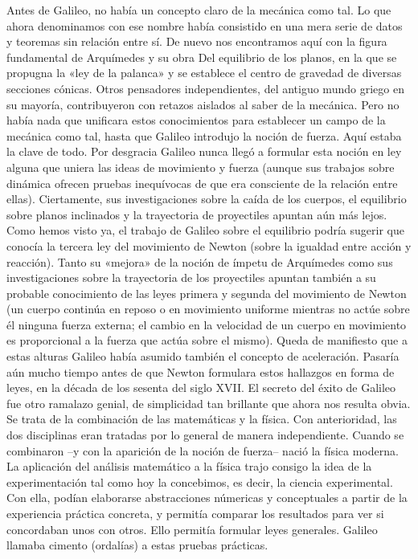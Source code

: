 \documentclass[letterpaper, 10pt, journal]{IEEEtran}
\begin{document}
Antes de Galileo, no había un concepto claro de la mecánica como tal. Lo que ahora denominamos con ese nombre había consistido en una mera serie de datos y teoremas sin relación entre sí. De nuevo nos encontramos aquí con la figura fundamental de Arquímedes y su obra Del equilibrio de los planos, en la que se propugna la «ley de la palanca» y se establece el centro de gravedad de diversas secciones cónicas. Otros pensadores independientes, del antiguo mundo griego en su mayoría, contribuyeron con retazos aislados al saber de la mecánica. Pero no había nada que unificara estos conocimientos para establecer un campo de la mecánica como tal, hasta que Galileo introdujo la noción de fuerza. Aquí estaba la clave de todo. Por desgracia Galileo nunca llegó a formular esta noción en ley alguna que uniera las ideas de movimiento y fuerza (aunque sus trabajos sobre dinámica ofrecen pruebas inequívocas de que era consciente de la relación entre ellas). Ciertamente, sus investigaciones sobre la caída de los cuerpos, el equilibrio sobre planos inclinados y la trayectoria de proyectiles apuntan aún más lejos.
\newline
Como hemos visto ya, el trabajo de Galileo sobre el equilibrio podría sugerir que conocía la tercera ley del movimiento de Newton (sobre la igualdad entre acción y reacción). Tanto su «mejora» de la noción de ímpetu de Arquímedes como sus investigaciones sobre la trayectoria de los proyectiles apuntan también a su probable conocimiento de las leyes primera y segunda del movimiento de Newton (un cuerpo continúa en reposo o en movimiento uniforme mientras no actúe sobre él ninguna fuerza externa; el cambio en la velocidad de un cuerpo en movimiento es proporcional a la fuerza que actúa sobre el mismo). Queda de manifiesto que a estas alturas Galileo había asumido también el concepto de aceleración. Pasaría aún mucho tiempo antes de que Newton formulara estos hallazgos en forma de leyes, en la década de los sesenta del siglo XVII.
\newline
El secreto del éxito de Galileo fue otro ramalazo genial, de simplicidad tan brillante que ahora nos resulta obvia. Se trata de la combinación de las matemáticas y la física. Con anterioridad, las dos disciplinas eran tratadas por lo general de manera independiente. Cuando se combinaron –y con la aparición de la noción de fuerza– nació la física moderna. La aplicación del análisis matemático a la física trajo consigo la idea de la experimentación tal como hoy la concebimos, es decir, la ciencia experimental. Con ella, podían elaborarse abstracciones númericas y conceptuales a partir de la experiencia práctica concreta, y permitía comparar los resultados para ver si concordaban unos con otros. Ello permitía formular leyes generales. Galileo llamaba cimento (ordalías) a estas pruebas prácticas.
\end{document}
